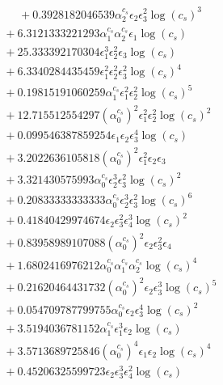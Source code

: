 \documentclass[10pt]{article}
\begin{document}
\begin{align*}
\phantom{F_{s,6}} &\phantom{={}}{}  + 0.3928182046539 \alpha_{2}^{c_s} \epsilon_{2} \epsilon_{3}^{2} \log{\left(c_{s} \right)}^{3} \\
&{}  + 6.3121333221293 \alpha_{1}^{c_s} \alpha_{2}^{c_s} \epsilon_{1} \log{\left(c_{s} \right)} \\
&{}  + 25.333392170304 \epsilon_{1}^{3} \epsilon_{2}^{2} \epsilon_{3} \log{\left(c_{s} \right)} \\
&{}  + 6.3340284435459 \epsilon_{1}^{2} \epsilon_{2}^{2} \epsilon_{3}^{2} \log{\left(c_{s} \right)}^{4} \\
&{}  + 0.19815191060259 \alpha_{1}^{c_s} \epsilon_{1}^{2} \epsilon_{2}^{2} \log{\left(c_{s} \right)}^{5} \\
&{}  + 12.715512554297 \left(\alpha_{0}^{c_s}\right)^{2} \epsilon_{1}^{2} \epsilon_{2}^{2} \log{\left(c_{s} \right)}^{2} \\
&{}  + 0.099546387859254 \epsilon_{1} \epsilon_{2} \epsilon_{3}^{4} \log{\left(c_{s} \right)} \\
&{}  + 3.2022636105818 \left(\alpha_{0}^{c_s}\right)^{2} \epsilon_{1}^{2} \epsilon_{2} \epsilon_{3} \\
&{}  + 3.321430575993 \alpha_{0}^{c_s} \epsilon_{2}^{3} \epsilon_{3}^{2} \log{\left(c_{s} \right)}^{2} \\
&{}  + 0.20833333333333 \alpha_{0}^{c_s} \epsilon_{2}^{3} \epsilon_{3}^{2} \log{\left(c_{s} \right)}^{6} \\
&{}  + 0.41840429974674 \epsilon_{2} \epsilon_{3}^{2} \epsilon_{4}^{3} \log{\left(c_{s} \right)}^{2} \\
&{}  + 0.83958989107088 \left(\alpha_{0}^{c_s}\right)^{2} \epsilon_{2} \epsilon_{3}^{2} \epsilon_{4} \\
&{}  + 1.6802416976212 \alpha_{0}^{c_s} \alpha_{1}^{c_s} \alpha_{2}^{c_s} \log{\left(c_{s} \right)}^{4} \\
&{}  + 0.21620464431732 \left(\alpha_{0}^{c_s}\right)^{2} \epsilon_{2} \epsilon_{3}^{3} \log{\left(c_{s} \right)}^{5} \\
&{}  + 0.054709787799755 \alpha_{0}^{c_s} \epsilon_{2} \epsilon_{3}^{4} \log{\left(c_{s} \right)}^{2} \\
&{}  + 3.5194036781152 \alpha_{1}^{c_s} \epsilon_{1}^{3} \epsilon_{2} \log{\left(c_{s} \right)} \\
&{}  + 3.5713689725846 \left(\alpha_{0}^{c_s}\right)^{4} \epsilon_{1} \epsilon_{2} \log{\left(c_{s} \right)}^{4} \\
&{}  + 0.45206325599723 \epsilon_{2} \epsilon_{3}^{3} \epsilon_{4}^{2} \log{\left(c_{s} \right)} \\

\end{align*}
\end{document}
